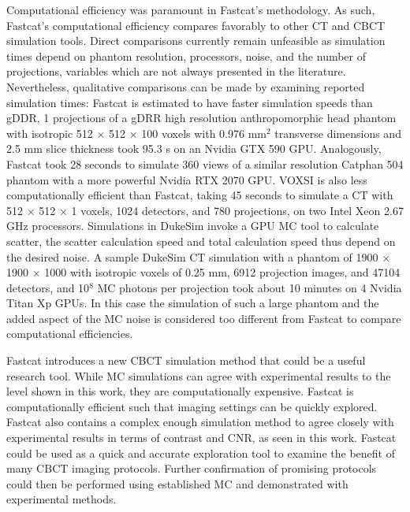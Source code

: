 Computational efficiency was paramount in Fastcat’s methodology. As such, Fastcat’s computational efficiency compares favorably to other CT and CBCT simulation tools. Direct comparisons currently remain unfeasible as simulation times depend on phantom resolution, processors, noise, and the number of projections, variables which are not always presented in the literature. Nevertheless, qualitative comparisons can be made by examining reported simulation times: Fastcat is estimated to have faster simulation speeds than gDDR, 1 projections of a gDRR high resolution anthropomorphic head phantom with isotropic 512 $\times$ 512 $\times$ 100 voxels with 0.976 mm$^2$ transverse dimensions and 2.5 mm slice thickness took 95.3 s on an Nvidia GTX 590 GPU. Analogously, Fastcat took 28 seconds to simulate 360 views of a similar resolution Catphan 504 phantom with a more powerful Nvidia RTX 2070 GPU. VOXSI is also less computationally efficient than Fastcat, taking 45 seconds to simulate a CT with 512 $\times$ 512 $\times$ 1 voxels, 1024 detectors, and 780 projections, on two Intel Xeon 2.67 GHz processors. Simulations in DukeSim invoke a GPU MC tool to calculate scatter, the scatter calculation speed and total calculation speed thus depend on the desired noise. A sample DukeSim CT simulation with a phantom of 1900 $\times$ 1900 $\times$ 1000 with isotropic voxels of 0.25 mm, 6912 projection images, and 47104 detectors, and 10$^8$ MC photons per projection took about 10 minutes on 4 Nvidia Titan Xp GPUs. In this case the simulation of such a large phantom and the added aspect of the MC noise is considered too different from Fastcat to compare computational efficiencies.

Fastcat introduces a new CBCT simulation method that could be a useful research tool. While MC simulations can agree with experimental results to the level shown in this work, they are computationally expensive. Fastcat is computationally efficient such that imaging settings can be quickly explored. Fastcat also contains a complex enough simulation method to agree closely with experimental results in terms of contrast and CNR, as seen in this work. Fastcat could be used as a quick and accurate exploration tool to examine the benefit of many CBCT imaging protocols. Further confirmation of promising protocols could then be performed using established MC and demonstrated with experimental methods.

